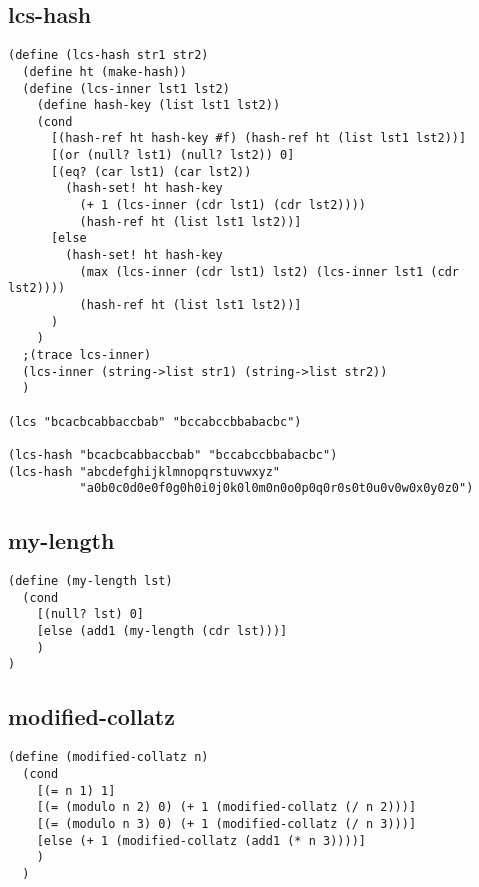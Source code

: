 \begin{multicols}{2}[]
\subsection{lcs-hash}
\begin{lstlisting}
(define (lcs-hash str1 str2)
  (define ht (make-hash))
  (define (lcs-inner lst1 lst2)
    (define hash-key (list lst1 lst2))
    (cond
      [(hash-ref ht hash-key #f) (hash-ref ht (list lst1 lst2))]
      [(or (null? lst1) (null? lst2)) 0]
      [(eq? (car lst1) (car lst2))
        (hash-set! ht hash-key
          (+ 1 (lcs-inner (cdr lst1) (cdr lst2))))
          (hash-ref ht (list lst1 lst2))]
      [else
        (hash-set! ht hash-key
          (max (lcs-inner (cdr lst1) lst2) (lcs-inner lst1 (cdr lst2))))
          (hash-ref ht (list lst1 lst2))]
      )
    )
  ;(trace lcs-inner)
  (lcs-inner (string->list str1) (string->list str2))
  )

(lcs "bcacbcabbaccbab" "bccabccbbabacbc")

(lcs-hash "bcacbcabbaccbab" "bccabccbbabacbc")
(lcs-hash "abcdefghijklmnopqrstuvwxyz"
          "a0b0c0d0e0f0g0h0i0j0k0l0m0n0o0p0q0r0s0t0u0v0w0x0y0z0")
\end{lstlisting}
\newpage
\subsection{my-length}
\begin{lstlisting}
(define (my-length lst)
  (cond
    [(null? lst) 0]
    [else (add1 (my-length (cdr lst)))]
    )
)
\end{lstlisting}
\subsection{modified-collatz}
\begin{lstlisting}
(define (modified-collatz n)
  (cond
    [(= n 1) 1]
    [(= (modulo n 2) 0) (+ 1 (modified-collatz (/ n 2)))]
    [(= (modulo n 3) 0) (+ 1 (modified-collatz (/ n 3)))]
    [else (+ 1 (modified-collatz (add1 (* n 3))))]
    )
  )
\end{lstlisting}
\end{multicols}
